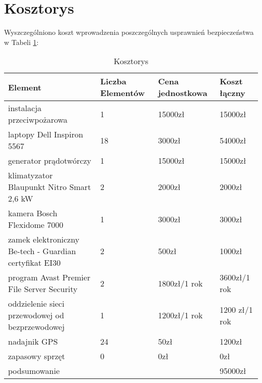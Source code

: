 \newpage
\section{Kosztorys}
Wyszczególniono koszt wprowadzenia poszczególnych usprawnień bezpieczeństwa w Tabeli \ref{kosztorys}:
\begin{longtable}[ht!]{|m{4cm}|m{3cm}|m{3cm}|m{3cm}|}
	\caption{Kosztorys}
	\label{kosztorys} \\
	\hline	
	\textbf{Element} & \textbf{Liczba \linebreak Elementów} & \textbf{Cena \linebreak jednostkowa} & \textbf{Koszt łączny} \\ \hline
	instalacja \linebreak przeciwpożarowa & 1 & 15000zł & 15000zł \\ \hline
	laptopy Dell Inspiron 5567 & 18 & 3000zł & 54000zł \\ \hline
	generator \linebreak prądotwórczy & 1 & 15000zł & 15000zł \\ \hline
	klimatyzator \linebreak Blaupunkt Nitro Smart 2,6 kW & 2 & 2000zł & 2000zł \\ \hline
	kamera Bosch \linebreak Flexidome 7000 & 1 & 3000zł & 3000zł \\ \hline
	zamek elektroniczny Be-tech - Guardian certyfikat EI30 & 2 & 500zł & 1000zł \\ \hline
	program Avast \linebreak Premier File Server Security & 2 & 1800zł/1 rok & 3600zł/1 rok \\ \hline
	oddzielenie sieci \linebreak przewodowej od bezprzewodowej & 1 & 1200zł/1 rok & 1200 zł/1 rok \\ \hline
	nadajnik GPS & 24 & 50zł & 1200zł \\ \hline
	zapasowy sprzęt & 0 & 0zł & 0zł \\ \hline
	podsumowanie & & & 95000zł \\ \hline
\end{longtable}